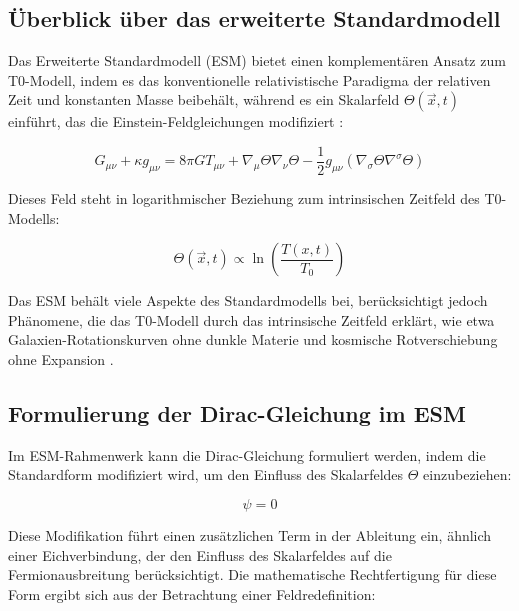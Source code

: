 \documentclass[12pt,a4paper]{article}
\newcommand{\Tfieldt}{T(x,t)}
\newcommand{\Tzero}{T_0}
\newcommand{\vecx}{\vec{x}}
\begin{document}
	\subsection{Überblick über das erweiterte Standardmodell}
	\label{subsec:esm_overview}
	
	Das Erweiterte Standardmodell (ESM) bietet einen komplementären Ansatz zum T0-Modell, indem es das konventionelle relativistische Paradigma der relativen Zeit und konstanten Masse beibehält, während es ein Skalarfeld $\Theta(\vecx,t)$ einführt, das die Einstein-Feldgleichungen modifiziert \cite{pascher_esm_comparison_2025}:
	
	\begin{equation}
		G_{\mu\nu} + \kappa g_{\mu\nu} = 8\pi G T_{\mu\nu} + \nabla_{\mu}\Theta\nabla_{\nu}\Theta - \frac{1}{2}g_{\mu\nu}(\nabla_{\sigma}\Theta\nabla^{\sigma}\Theta)
		\label{eq:modified_einstein}
	\end{equation}
	
	Dieses Feld steht in logarithmischer Beziehung zum intrinsischen Zeitfeld des T0-Modells:
	
	\begin{equation}
		\Theta(\vecx,t) \propto \ln\left(\frac{\Tfieldt}{\Tzero}\right)
		\label{eq:theta_relation}
	\end{equation}
	
	Das ESM behält viele Aspekte des Standardmodells bei, berücksichtigt jedoch Phänomene, die das T0-Modell durch das intrinsische Zeitfeld erklärt, wie etwa Galaxien-Rotationskurven ohne dunkle Materie und kosmische Rotverschiebung ohne Expansion \cite{pascher_standardmod_2025}.
	
	\subsection{Formulierung der Dirac-Gleichung im ESM}
	\label{subsec:dirac_formulation}
	
	Im ESM-Rahmenwerk kann die Dirac-Gleichung formuliert werden, indem die Standardform modifiziert wird, um den Einfluss des Skalarfeldes $\Theta$ einzubeziehen:
	
	\begin{equation}
		[i\gamma^{\mu}(\partial_{\mu} + \partial_{\mu}\Theta) - m]\psi = 0
		\label{eq:modified_dirac}
	\end{equation}
	
	Diese Modifikation führt einen zusätzlichen Term in der Ableitung ein, ähnlich einer Eichverbindung, der den Einfluss des Skalarfeldes auf die Fermionausbreitung berücksichtigt. Die mathematische Rechtfertigung für diese Form ergibt sich aus der Betrachtung einer Feldredefinition:
	
\end{document}
